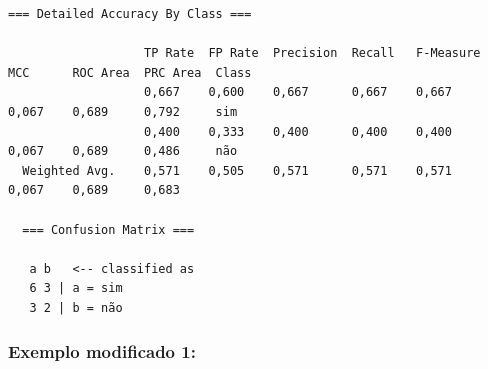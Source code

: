 \documentclass[
    article,            %
    11pt,               %
    oneside,            %
    a4paper,            %
    english,            %
    brazil,             %
    sumario=tradicional,
    ]{abntex2}
\begin{document}
\begin{itemize}
\begin{Verbatim}[frame=single, fontsize=\tiny]
  === Detailed Accuracy By Class ===

                   TP Rate  FP Rate  Precision  Recall   F-Measure  MCC      ROC Area  PRC Area  Class
                   0,667    0,600    0,667      0,667    0,667      0,067    0,689     0,792     sim
                   0,400    0,333    0,400      0,400    0,400      0,067    0,689     0,486     não
  Weighted Avg.    0,571    0,505    0,571      0,571    0,571      0,067    0,689     0,683     

  === Confusion Matrix ===

   a b   <-- classified as
   6 3 | a = sim
   3 2 | b = não
  \end{Verbatim}
\end{itemize}

\subsubsection{\textbf{Exemplo modificado 1:}}
\end{document}
